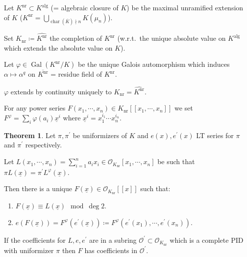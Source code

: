 \documentclass[openany]{amsbook}
\numberwithin{section}{chapter}
\theoremstyle{definition}
\newtheorem{theorem}{Theorem}[chapter]
\begin{document}
Let \(K^{\text{nr}} \subset K^{\text{alg}} \) (= algebraic closure of \(K\)) be the maximal unramified extension of \(K\) (\(K^{\text{nr}} = \bigcup_{\operatorname{char}(\overline{K}) \nmid n} K(\mu_n)\)).

Set \(K_{\text{nr}} \coloneqq \widehat{K^{\text{nr}}}\) the completion of \(K^{\text{nr}}\) (w.r.t.\ the unique absolute value on \(K^{\text{alg}}\) which extends the absolute value on \(K\)).

Let \(\varphi \in \operatorname{Gal}(K^{\text{nr}} / K)\) be the unique Galois automorphism which induces \(\alpha \mapsto \alpha^q\) on \(\overline{K^{\text{nr}}}\) = residue field of \(K^{\text{nr} } \).

\(\varphi\) extends by continuity uniquely to \(K_{\text{nr}} = \widehat{K^{\text{nr}}}\).

For any power series \(F(x_1, \cdots , x_n) \in K_{\text{nr}}[[x_1, \cdots , x_n]]\) we set \(F^{\varphi} = \sum_{i} \varphi(a_i) \underline{x}^i\) where \(\underline{x}^i = x_1^{i_1} \cdots x_n^{i_n}\).

\begin{theorem}
    Let \(\pi, \pi ^{\prime} \) be uniformizers of \(K\) and \(e(x), e^{\prime} (x)\) LT series for \(\pi\) and \(\pi^{\prime}\) respectively.

    Let \(L(x_1, \cdots , x_n) = \sum_{i=1}^n a_i x_i \in \mathcal{O}_{K_{\text{nr}}} [x_1, \cdots , x_n]\) be such that \(\pi L(\underline{x}) = \pi ^{\prime} L^{\varphi}(\underline{x}) \).

    Then there is a unique \(F(\underline{x}) \in \mathcal{O}_{K_{\text{nr}}}[[x]]\) such that:
    
    \begin{enumerate}[label=\roman*)]
        \item \(F(\underline{x}) \equiv L(\underline{x}) \mod \deg 2\).
        
        \item \(e(F(\underline{x})) = F^{\varphi}(e^{\prime}(\underline{x})) \coloneqq F^{\varphi}(e^{\prime}(x_1), \cdots , e^{\prime}(x_n))\). 
    \end{enumerate} 

    If the coefficients for \(L, e, e^{\prime}\) are in a subring \(\mathcal{O}^{\prime} \subset \mathcal{O}_{K_{\text{nr}}}\) which is a complete PID with uniformizer \(\pi\) then \(F\) has coefficients in \(\mathcal{O}^{\prime}\).

\end{theorem}
\end{document}
